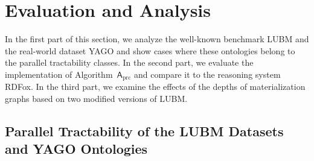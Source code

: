 \section{Evaluation and Analysis}
\label{sec:evaluation}

In the first part of this section, we analyze the well-known benchmark LUBM
and the real-world dataset YAGO and
show cases where these ontologies belong to the parallel tractability classes.
%
In the second part, we evaluate the implementation of Algorithm~$\mathsf{A}_{\text{prc}}$
and compare it to the reasoning system RDFox.
%
In the third part, we examine the effects of the depths of materialization graphs
based on two modified versions of LUBM.



\subsection{Parallel Tractability of the LUBM Datasets and YAGO Ontologies}
\label{sec:lubm-yago}

